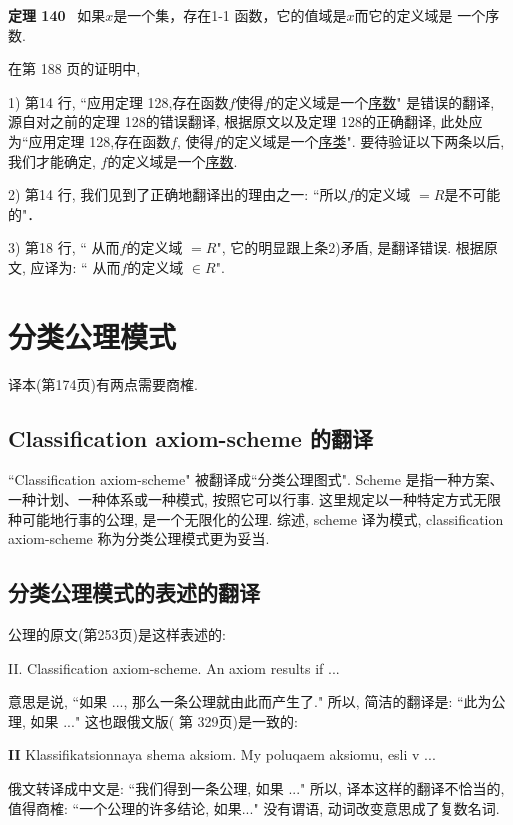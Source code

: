 \documentclass[zihao=-4,a4paper]{ctexart}
\begin{document}
{\bf 定理 140} \,  
{\kaishu
如果$x$是一个集，存在1-1 函数，它的值域是$x$而它的定义域是
一个序数.
}

在\cite{jkelley2010zh}第 188 页的证明中, 

1) 第14 行, “应用定理 128,存在函数$f$使得$f$的定义域是一个\underline{序数}" 
是错误的翻译, 源自对之前的定理 128的错误翻译, 根据原文以及定理 128的正确翻译,
此处应为“应用定理 128,存在函数$f$, 使得$f$的定义域是一个\underline{序类}". 要待验证以下两条以后,我们才能确定, $f$的定义域是一个\underline{序数}.

2) 第14 行,  我们见到了正确地翻译出的理由之一: “所以$f$的定义域
$=R$是不可能的"．

3) 第18 行,  “ 从而$f$的定义域 $=R$", 它的明显跟上条2)矛盾, 是翻译错误. 根据原文, 
应译为: “ 从而$f$的定义域 $\in R$".


\section{分类公理模式 }	
译本(\cite{jkelley2010zh}第174页)有两点需要商榷.
\subsection{Classification axiom-scheme 的翻译}
“Classification axiom-scheme" 被翻译成“分类公理图式". Scheme  是指一种方案、一种计划、一种体系或一种模式, 按照它可以行事. 这里规定以一种特定方式无限种可能地行事的公理, 是一个无限化的公理. 
综述, scheme 译为模式, classification axiom-scheme 称为分类公理模式更为妥当.

\subsection{分类公理模式的表述的翻译}
公理的原文(\cite{enderton1977}第253页)是这样表述的:

II. Classification axiom-scheme. An axiom results if ... 

\noindent 意思是说, “如果 ...,
那么一条公理就由此而产生了." 所以, 简洁的翻译是: “此为公理, 如果 ..."
这也跟俄文版(\cite{jkelley1968ru} 第 329页)是一致的: 

{\bf II}  {\selectfont 
Klassifika{ts}ionna{ya}   {s}hema aksiom.
	My poluqaem aksiomu, esli v ...
}

\noindent 俄文转译成中文是: “我们得到一条公理, 如果 ..."
所以, 译本这样的翻译不恰当的,值得商榷: “一个公理的许多结论, 如果..." 没有谓语, 动词改变意思成了复数名词.
\end{document}
